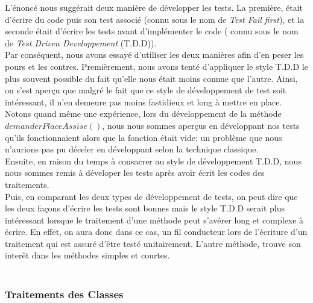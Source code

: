 \documentclass[a4paper,11pts]{article}
\begin{document}
L'énoncé nous suggérait deux manière de développer les tests. La première, était d'écrire du code puis son test associé (connu sous le nom de \textit{Test Fail first}), et la seconde était d'écrire les tests avant d'implémenter le code ( connu sous le nom de \textit{Test Driven Developpement} (T.D.D)). \\
Par conséquent, nous avons essayé d'utiliser les deux manières afin d'en peser les pours et les contres.
\newpage
Premièrement, nous avons tenté d'appliquer le style T.D.D le plus souvent possible du fait qu'elle nous était moins connue que l'autre. Ainsi, on s'est aperçu que malgré le fait que ce style de développement de test soit intéressant, il n'en demeure pas moins fastidieux et long à mettre en place. Notons quand même une expérience, lors du développement de la méthode $demanderPlaceAssise()$, nous nous sommes aperçus en développant nos tests qu'ils fonctionnaient alors que la fonction était vide: un problème que nous n'aurions pas pu déceler en développant selon la technique classique.
\\
Ensuite, en raison du temps à consacrer au style de développement T.D.D, nous nous sommes remis à déveloper les tests après avoir écrit les codes des traitements.
\\
Puis, en comparant les deux types de développement de tests, on peut dire que les deux façons d'écrire les tests sont bonnes mais le style T.D.D serait plus intéressant lorsque le traitement d'une méthode peut s'avérer long et complexe à écrire. En effet, on aura donc dans ce cas, un fil conducteur lors de l'écriture d'un traitement qui est assuré d'être testé unitairement. L'autre méthode, trouve son interêt dans les méthodes simples et courtes. 
\\
\\


\subsubsection{Traitements des Classes} 
\end{document}
